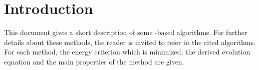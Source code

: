 
\newpage

\pagestyle{fancy}
\fancyhead{} %
\fancyhead[LE,RO]{\nouppercase\leftmark}

\tableofcontents
{}


\newpage

\pagestyle{fancy}
\fancyhead{} %

\chapter*{Introduction}
\label{chap:intro}

\vspace{0.5cm}
\hspace{0.7cm} This document gives a short description of some \ls-based algorithms. For further details about these methods, the reader is invited to refer to the cited algorithms. For each method, the energy criterion which is minimized, the derived evolution equation and the main properties of the method are given.